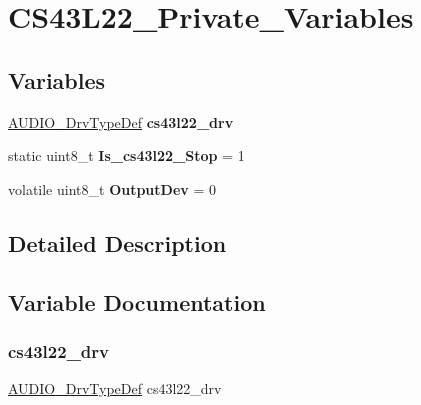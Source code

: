 \hypertarget{group___c_s43_l22___private___variables}{}\section{C\+S43\+L22\+\_\+\+Private\+\_\+\+Variables}
\label{group___c_s43_l22___private___variables}
\subsection*{Variables}
\begin{DoxyCompactItemize}
\item 
\mbox{\hyperlink{struct_a_u_d_i_o___drv_type_def}{A\+U\+D\+I\+O\+\_\+\+Drv\+Type\+Def}} {\bfseries cs43l22\+\_\+drv}
\item 
\mbox{\label{group___c_s43_l22___private___variables_ga3f475102edbc163701bafdc4b14d48e1}} 
static uint8\+\_\+t {\bfseries Is\+\_\+cs43l22\+\_\+\+Stop} = 1
\item 
\mbox{\label{group___c_s43_l22___private___variables_ga25562d7df26324014c7d767ea1ec80f2}} 
volatile uint8\+\_\+t {\bfseries Output\+Dev} = 0
\end{DoxyCompactItemize}


\subsection{Detailed Description}


\subsection{Variable Documentation}
\mbox{\label{group___c_s43_l22___private___variables_gaeefb43f26352ff4df610fd8bca1b279d}} 
\subsubsection{\texorpdfstring{cs43l22\+\_\+drv}{cs43l22\_drv}}
{\footnotesize\ttfamily \mbox{\hyperlink{struct_a_u_d_i_o___drv_type_def}{A\+U\+D\+I\+O\+\_\+\+Drv\+Type\+Def}} cs43l22\+\_\+drv}

